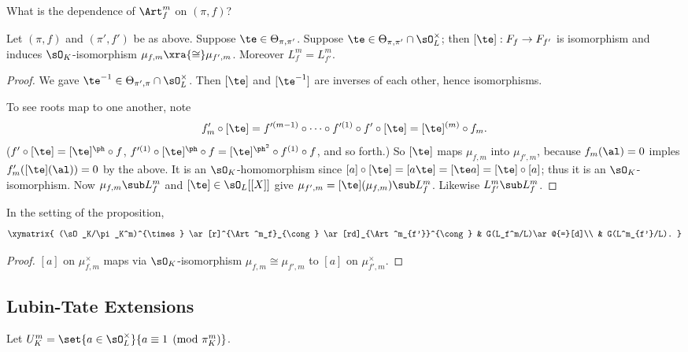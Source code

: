 What is the dependence of $\Art_f^m$ on $(\pi,f)$?
\begin{pr}
Let $(\pi,f)$ and $(\pi',f')$ be as above. Suppose $\te\in \Theta_{\pi,\pi'}$. Suppose $\te\in \Theta_{\pi,\pi'}\cap \sO_L^{\times}$; then $[\te]:F_f\to F_{f'}$ is isomorphism and induces $\sO_K$-isomorphism $\mu_{f,m}\xra{\cong}\mu_{f',m}$. Moreover $L_f^m=L_{f'}^m$.
\end{pr}
\begin{proof}
We gave $\te^{-1}\in \Theta_{\pi',\pi}\cap \sO_L^{\times}$. Then $[\te]$ and $[\te^{-1}]$ are inverses of each other, hence isomorphisms.

To see roots map to one another, note
\[
f_m'\circ [\te]=f'^{(m-1)}\circ \cdots \circ f'^{(1)} \circ f'\circ [\te]=[\te]^{(m)}\circ f_m.
\]
($f'\circ [\te]=[\te]^{\ph}\circ f$, $f'^{(1)}\circ [\te]^{\ph}\circ f=[\te]^{\ph^2}\circ f^{(1)}\circ f$, and so forth.)
So $[\te]$ maps $\mu_{f,m}$ into $\mu_{f',m}$, because $f_m(\al)=0$ imples $f_m'([\te](\al))=0$ by the above. It is an $\sO_K$-homomorphism since $[a]\circ [\te]=[a\te]=[\te a]=[\te]\circ[a]$; thus it is an $\sO_K$-isomorphism.
Now $\mu_{f,m}\sub L_f^m$ and $[\te]\in \sO_L[[X]]$ give $\mu_{f',m}=[\te](\mu_{f,m})\sub L_f^m$. Likewise $L_{f'}^m\sub L_f^m$.
\end{proof}
\begin{cor}
In the setting of the proposition,
\[
\xymatrix{
(\sO_K/\pi_K^m)^{\times} \ar[r]^{\Art^m_f}_{\cong}
\ar[rd]_{\Art^m_{f'}}^{\cong} & G(L_f^m/L)\ar@{=}[d]\\
& G(L^m_{f'}/L).
}
\]
\end{cor}
\begin{proof}
$[a]$ on $\mu_{f,m}^{\times}$ maps via $\sO_K$-isomorphism $\mu_{f,m}\cong \mu_{f',m}$ to $[a]$ on $\mu_{f',m}^{\times}$.
\end{proof}
\subsection{Lubin-Tate Extensions}
Let $U_K^m=\set{a\in \sO_L^{\times}}{a\equiv 1\pmod{\pi_K^m}}$. 

